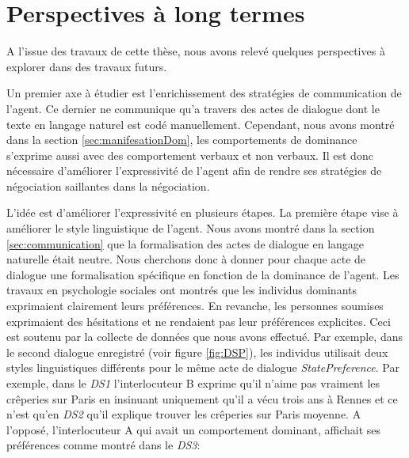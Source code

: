 \section{Perspectives à long termes}

	A l’issue des travaux de cette thèse, nous avons relevé quelques perspectives à explorer dans des travaux futurs.			
	
	Un premier axe à étudier est l'enrichissement des stratégies de communication de l'agent. Ce dernier ne communique qu'a travers des actes de dialogue dont le texte en langage naturel est codé manuellement. Cependant, nous avons montré dans la section \ref{sec:manifesationDom}, les comportements de dominance s'exprime aussi avec des comportement verbaux et non verbaux.
	Il est donc nécessaire d'améliorer l'expressivité de l'agent afin de rendre ses stratégies de négociation saillantes dans la négociation. 
	
	L'idée est d'améliorer l'expressivité en plusieurs étapes. 
	La première étape vise à améliorer le style linguistique de l'agent. Nous avons montré dans la section \ref{sec:communication} que la formalisation des actes de dialogue en langage naturelle était neutre. 
	Nous cherchons donc à donner pour chaque acte de dialogue une formalisation spécifique en fonction de la dominance de l'agent. Les travaux en psychologie sociales ont montrés que les individus dominants exprimaient clairement leurs préférences. En revanche, les personnes soumises exprimaient des hésitations et ne rendaient pas leur préférences explicites.  Ceci est soutenu par la collecte de données que nous avons effectué.
	Par exemple, dans le second dialogue enregistré (voir figure \ref{fig:DSP}), les individus utilisait deux styles linguistiques différents pour le même acte de dialogue \emph{StatePreference}. Par exemple, dans le \emph{DS1} l'interlocuteur B exprime qu'il n'aime pas vraiment les crêperies sur Paris en insinuant uniquement qu'il a vécu trois ans à Rennes et ce n'est qu'en \emph{DS2} qu'il explique trouver les crêperies sur Paris moyenne.
	A l'opposé, l'interlocuteur A qui avait un comportement dominant, affichait ses préférences comme montré dans le \emph{DS3}:
	
